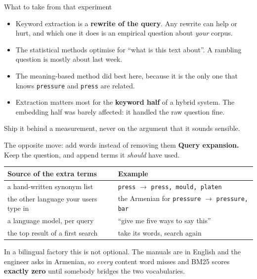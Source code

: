 \documentclass[aspectratio=169]{beamer}
\newcommand{\keybox}[1]{%
  \begin{tcolorbox}[colback=armblue!8, colframe=armblue, boxrule=0.6pt, arc=2pt]
  #1
  \end{tcolorbox}}
\newcommand{\takebox}[1]{%
  \begin{tcolorbox}[colback=paramgreen!8, colframe=paramgreen, boxrule=0.6pt, arc=2pt]
  #1
  \end{tcolorbox}}
\begin{document}
\begin{frame}{What to take from that experiment}
  \vspace{0.8em}
  \begin{itemize}
    \item Keyword extraction is a \textbf{rewrite of the query}. Any rewrite can help or
      hurt, and which one it does is an empirical question about \emph{your} corpus.
    \item The statistical methods optimise for ``what is this text about''. A rambling
      question is mostly about last week.
    \item The meaning-based method did best here, because it is the only one that knows
      \texttt{pressure} and \texttt{press} are related.
    \item Extraction matters most for the \textbf{keyword half} of a hybrid system. The
      embedding half was barely affected: it handled the raw question fine.
  \end{itemize}

  \vspace{0.8em}
  \takebox{Ship it behind a measurement, never on the argument that it sounds sensible.}
\end{frame}

\begin{frame}{The opposite move: add words instead of removing them}
  \vspace{0.6em}
  \textbf{Query expansion.} Keep the question, and append terms it \emph{should} have used.

  \vspace{0.8em}
  \begin{center}
  \small
  \begin{tabular}{ll}
    \toprule
    \textbf{Source of the extra terms} & \textbf{Example} \\
    \midrule
    a hand-written synonym list & \texttt{press} $\to$ \texttt{press, mould, platen} \\
    the other language your users type in & the Armenian for \texttt{pressure}
      $\to$ \texttt{pressure, bar} \\
    a language model, per query & ``give me five ways to say this'' \\
    the top result of a first search & take its words, search again \\
    \bottomrule
  \end{tabular}
  \end{center}

  \vspace{0.9em}
  \keybox{In a bilingual factory this is not optional. The manuals are in English and the
  engineer asks in Armenian, so \emph{every} content word misses and BM25 scores
  \textbf{exactly zero} until somebody bridges the two vocabularies.}
\end{frame}
\end{document}
